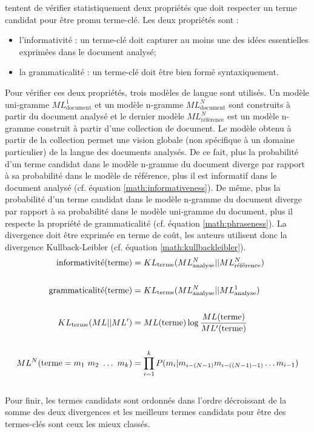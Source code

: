         \citet{tomokiyo2003languagemodel} tentent de vérifier statistiquement deux
        propriétés que doit respecter un terme candidat pour être promu terme-clé.
        Les deux propriétés sont :
        \begin{itemize}
          \item{l'informativité : un terme-clé doit capturer au moins une des
                idées essentielles exprimées dans le document analysé;}
          \item{la grammaticalité : un terme-clé doit être bien formé
                syntaxiquement.}
        \end{itemize}
        Pour vérifier ces deux propriétés, trois modèles de langue sont utilisés.
        Un modèle uni-gramme $ML_{\text{document}}^1$ et un modèle n-gramme
        $ML_{\text{document}}^N$ sont construits à partir du document analysé et
        le dernier modèle $ML_{\text{référence}}^N$ est un modèle n-gramme
        construit à partir d'une collection de document. Le modèle obtenu à partir
        de la collection permet une vision globale (non spécifique à un
        domaine particulier) de la langue des documents analysés. De ce fait, plus
        la probabilité d'un terme candidat dans le modèle n-gramme du document
        diverge par rapport à sa probabilité dans le modèle de référence, plus il
        est informatif dans le document analysé (cf. équation
        \ref{math:informativeness}).  De même, plus la probabilité d'un terme
        candidat dans le modèle n-gramme du document diverge par rapport à sa
        probabilité dans le modèle uni-gramme du document, plus il respecte la
        propriété de grammaticalité (cf. équation \ref{math:phraseness}). La
        divergence doit être exprimée en terme de coût, les auteurs utilisent donc
        la divergence Kullback-Leibler (cf. équation \ref{math:kullbackleibler}).
        \begin{align}
          \text{informativité}(\text{terme}) &= KL_{\text{terme}}(ML_{\text{analyse}}^{N} || ML_{\text{référence}}^{N}) \label{math:informativeness}\\
          \notag\\
          \text{grammaticalité}(\text{terme}) &= KL_{\text{terme}}(ML_{\text{analyse}}^{N} || ML_{\text{analyse}}^{1}) \label{math:phraseness}\\
          \notag\\
          KL_{\text{terme}}(ML || ML') &= ML(\text{terme}) \log \frac{ML(\text{terme})}{ML'(\text{terme})} \label{math:kullbackleibler}\\
          \notag\\
          ML^N(\text{terme} = m_1\ m_2\ \dots\ m_k) &= \prod_{i = 1}^k P(m_i | m_{i - (N - 1)} m_{i - ((N - 1) - 1)} \dots m_{i - 1}) \notag
        \end{align}\\
        Pour finir, les termes candidats sont ordonnés dans l'ordre décroissant de
        la somme des deux divergences et les meilleurs termes candidats pour être
        des termes-clés sont ceux les mieux classés.

